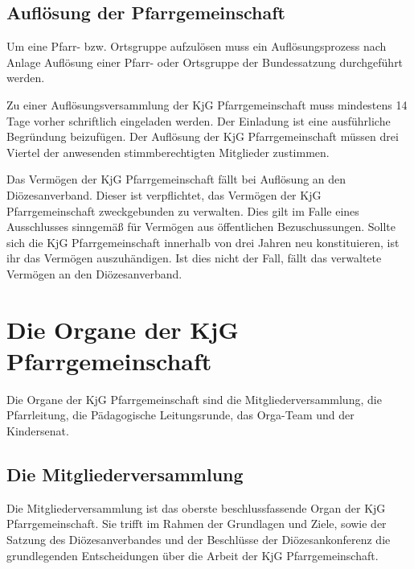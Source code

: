 \documentclass[12pt]{report}
\begin{document}
\begin{justify}
\subsection{Auflösung der Pfarrgemeinschaft}
Um eine Pfarr- bzw. Ortsgruppe aufzulösen muss ein 
Auflösungsprozess nach Anlage \glqq Auflösung einer Pfarr- oder Ortsgruppe\grqq{} der 
Bundessatzung durchgeführt werden.

Zu einer Auflösungsversammlung der KjG Pfarrgemeinschaft muss mindestens 14 Tage vorher
schriftlich eingeladen werden. Der Einladung ist eine ausführliche Begründung beizufügen. Der
Auflösung der KjG Pfarrgemeinschaft müssen drei Viertel der anwesenden stimmberechtigten
Mitglieder zustimmen.

Das Vermögen der KjG Pfarrgemeinschaft fällt bei Auflösung an den Diözesanverband.
Dieser ist verpflichtet, das Vermögen der KjG Pfarrgemeinschaft zweckgebunden zu verwalten.
Dies gilt im Falle eines Ausschlusses sinngemäß für Vermögen aus öffentlichen Bezuschussungen.
Sollte sich die KjG Pfarrgemeinschaft innerhalb von drei Jahren neu konstituieren, ist ihr das
Vermögen auszuhändigen. Ist dies nicht der Fall, fällt das verwaltete Vermögen an den Diözesanverband.

\section{Die Organe der KjG Pfarrgemeinschaft}
Die Organe der KjG Pfarrgemeinschaft sind die Mitgliederversammlung, die Pfarrleitung,
die Pädagogische Leitungsrunde, das Orga-Team und der Kindersenat.

\subsection{Die Mitgliederversammlung}
Die Mitgliederversammlung ist das oberste beschlussfassende Organ der KjG Pfarrgemeinschaft.
Sie trifft im Rahmen der Grundlagen und Ziele, sowie der Satzung des Diözesanverbandes und
der Beschlüsse der Diözesankonferenz die grundlegenden Entscheidungen über die Arbeit der
KjG Pfarrgemeinschaft.


\end{justify}
\end{document}
